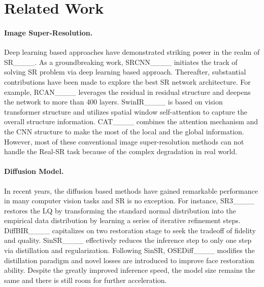 \section{Related Work}
\paragraph{Image Super-Resolution.} 
Deep learning based approaches have demonstrated striking power in the realm of SR____.
As a groundbreaking work, SRCNN____ initiates the track of solving SR problem via deep learning based approach.
Thereafter, substantial contributions have been made to explore the best SR network architecture.
For example, RCAN____ leverages the residual in residual structure and deepens the network to more than 400 layers.
SwinIR____ is based on vision transformer structure and utilizes spatial window self-attention to capture the overall structure information.
CAT____ combines the attention mechanism and the CNN structure to make the most of the local and the global information.
However, most of these conventional image super-resolution methods can not handle the Real-SR task because of the complex degradation in real world.

\vspace{-4mm}
\paragraph{Diffusion Model.} 
In recent years, the diffusion based methods have gained remarkable performance in many computer vision tasks and SR is no exception.
For instance, SR3____ restores the LQ by transforming the standard normal distribution into the empirical data distribution by learning a series of iterative refinement steps.
DiffBIR____ capitalizes on two restoration stage to seek the tradeoff of fidelity and quality.
SinSR____ effectively reduces the inference step to only one step via distillation and regularization.
Following SinSR, OSEDiff____ modifies the distillation paradigm and novel losses are introduced to improve face restoration ability.
Despite the greatly improved inference speed, the model size remains the same and there is still room for further acceleration.



\vspace{-4mm}
